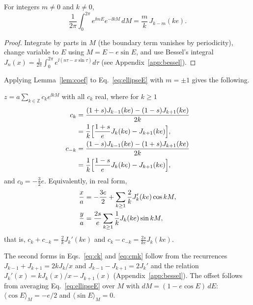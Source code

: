 \begin{lemma}
\label{lem:coef}
For integers $m\ne0$ and $k\ne0$,
\begin{equation}
\frac1{2\pi}\int_0^{2\pi}e^{\ii mE}e^{-\ii kM}\,dM=\frac mk\,J_{k-m}(ke).
\label{eq:lemma}
\end{equation}
\end{lemma}
\begin{proof}
Integrate by parts in $M$ (the boundary term vanishes by periodicity),
change variable to $E$ using $M=E-e\sin E$, and use Bessel's integral
$J_n(x)=\frac1{2\pi}\int_0^{2\pi}e^{\ii(n\tau-x\sin\tau)}d\tau$ (see
Appendix~\ref{app:bessel}).
\end{proof}

Applying Lemma~\ref{lem:coef} to Eq.~\eqref{eq:ellipseE} with $m=\pm1$ gives
the following.

\begin{proposition}
\label{prop:series}
$z=a\sum_{k\in\mathbb Z}c_ke^{\ii kM}$ with all $c_k$ real, where for
$k\ge1$
\begin{align}
c_k&=\frac{(1+s)J_{k-1}(ke)-(1-s)J_{k+1}(ke)}{2k}\notag\\
&=\frac1k\Big[\frac{1+s}{e}J_k(ke)-J_{k+1}(ke)\Big],\label{eq:ck}\\
c_{-k}&=\frac{(1-s)J_{k-1}(ke)-(1+s)J_{k+1}(ke)}{2k}\notag\\
&=\frac1k\Big[\frac{1-s}{e}J_k(ke)-J_{k+1}(ke)\Big],\label{eq:cmk}
\end{align}
and $c_0=-\tfrac32 e$. Equivalently, in real form,
\begin{align}
\frac xa&=-\frac{3e}{2}+\sum_{k\ge1}\frac2kJ_k'(ke)\cos kM,\notag\\
\frac ya&=\frac{2s}{e}\sum_{k\ge1}\frac1kJ_k(ke)\sin kM,
\label{eq:realform}
\end{align}
that is, $c_k+c_{-k}=\tfrac2kJ_k'(ke)$ and $c_k-c_{-k}=\tfrac{2s}{ke}J_k(ke)$.
\end{proposition}

The second forms in Eqs.~\eqref{eq:ck} and \eqref{eq:cmk} follow from the
recurrences $J_{k-1}+J_{k+1}=2kJ_k/x$ and $J_{k-1}-J_{k+1}=2J_k'$ and
the relation $J_k'(x)=kJ_k(x)/x-J_{k+1}(x)$ (Appendix~\ref{app:bessel}).
The offset follows from averaging Eq.~\eqref{eq:ellipseE} over $M$ with
$dM=(1-e\cos E)\,dE$: $\langle\cos E\rangle_M=-e/2$ and
$\langle\sin E\rangle_M=0$.


